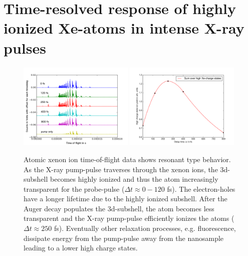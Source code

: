 \section{Time-resolved response of highly ionized Xe-atoms in intense X-ray pulses}
\begin{figure}
	\centering
		\includegraphics[width=0.49\textwidth]{images/results/TOF-atomic-xenon.png}
		\includegraphics[width=0.49\textwidth]{images/results/atomic-charge-state-time-resolved.pdf}
	\caption{Atomic xenon ion time-of-flight data shows resonant type behavior. As the X-ray pump-pulse traverses through the xenon ions, the 3d-subshell becomes highly ionized and thus the atom increasingly transparent for the probe-pulse ($\Delta t \approx 0-120$ fs). The electron-holes have a longer lifetime due to the highly ionized subshell. After the Auger decay populates the 3d-subshell, the atom becomes less transparent and the X-ray pump-pulse efficiently ionizes the atoms ($\Delta t \approx 250$ fs). Eventually other relaxation processes, e.g. fluorescence, dissipate energy from the pump-pulse away from the nanosample leading to a lower high charge states.}
	\label{fig:TOF-atomic-xenon}
\end{figure}
